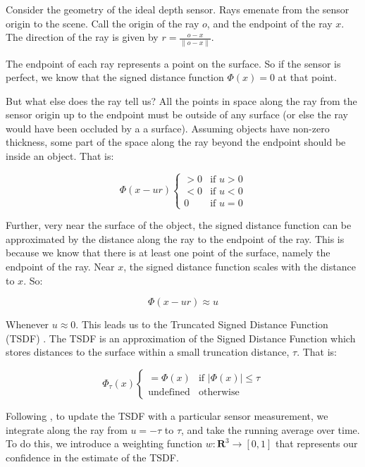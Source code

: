 \documentclass[conference,10pt]{IEEEtran}
\begin{document}
Consider the geometry of the ideal depth sensor. Rays emenate from the sensor
origin to the scene. Call the origin of the ray $o$, and the endpoint of the ray
$x$. The direction of the ray is given by $r = \frac{o - x}{\|o - x\|}$.

The endpoint of each ray represents a point on the surface. So if the sensor is
perfect, we know that the signed distance function $\Phi(x) = 0$ at that point. 

But what else does the ray tell us? All the points in space along the ray from
the sensor origin up to the endpoint must be outside of any surface (or else the
ray would have been occluded by a a surface). Assuming objects have non-zero
thickness, some part of the space along the ray beyond the endpoint should be
inside an object. That is:

$$ \Phi(x - ur) 
     \begin{cases}
     > 0 & \text{if } u > 0 \\
     < 0 & \text{if } u < 0 \\
     0 & \text{if } u = 0
     \end{cases}
     $$

Further, very near the surface of the object, the signed distance function can
be approximated by the distance along the ray to the endpoint of the ray. This
is because we know that there is at least one point of the surface, namely the
endpoint of the ray. Near $x$, the signed distance function scales with the
distance to $x$. So:

$$ \Phi(x - ur) \approx u $$

\noindent Whenever $u \approx 0$. This leads us to the Truncated Signed Distance
Function (TSDF) \cite{Curless1996}. The TSDF is an approximation of the Signed
Distance Function which stores distances to the surface within a small truncation distance,
$\tau$. That is:

$$ \Phi_{\tau}(x) \begin{cases}
	 = \Phi(x) & \text{if } |\Phi(x)| \leq \tau \\
	 \text{undefined} & \text{otherwise}
	 \end{cases}
$$

Following \cite{Curless1996}, to update the TSDF with a particular sensor
measurement, we integrate along the ray from $u = -\tau$ to $\tau$, and take the
running average over time. To do this, we introduce a weighting function $w :
\mathbf{R}^3 \to [0, 1]$ that represents our confidence in the estimate of the
TSDF.
\end{document}
